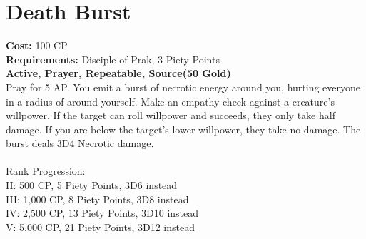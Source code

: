 \section{Death Burst}\label{prayer:deathBurst}
\textbf{Cost:} 100 CP\\
\textbf{Requirements:} Disciple of Prak, 3 Piety Points \\
\textbf{Active, Prayer, Repeatable, Source(50 Gold)}\\
Pray for 5 AP.
You emit a burst of necrotic energy around you, hurting everyone in a radius of  around yourself.
Make an empathy check against a creature's willpower.
If the target can roll willpower and succeeds, they only take half damage.
If you are below the target's lower willpower, they take no damage.
The burst deals 3D4 Necrotic damage.\\
\\
Rank Progression:\\
II: 500 CP, 5 Piety Points, 3D6 instead\\
III: 1,000 CP, 8 Piety Points, 3D8 instead\\
IV: 2,500 CP, 13 Piety Points, 3D10 instead\\
V: 5,000 CP, 21 Piety Points, 3D12 instead\\
